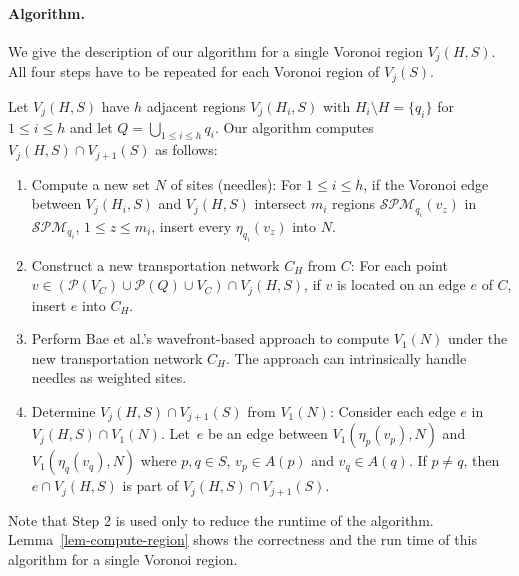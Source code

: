 \documentclass[11pt]{llncs}
\renewcommand{\P}{\ensuremath{\mathcal{P}}}
\newcommand{\SPM}{\ensuremath{\mathcal{SPM}}}
\begin{document}
\paragraph{Algorithm.}
We give the description of our algorithm for a single Voronoi region $V_{j}(H, S)$.
All four steps have to be repeated for each Voronoi region of $V_j(S)$.

Let $V_{j}(H, S)$ have $h$ adjacent regions $V_{j}(H_i, S)$ with $H_i \setminus H = \{q_i\}$ for $1\leq i\leq h$
and let $Q = \bigcup_{1\leq i\leq h} q_i$.
Our algorithm computes $V_{j}(H, S)\cap V_{j+1}(S)$ as follows:
\begin{enumerate}
  \item Compute a new set $N$ of sites (needles):
        For $1\leq i\leq h$, if the Voronoi edge between $V_j(H_i, S)$ and $V_{j}(H, S)$ intersect $m_i$ regions $\SPM_{q_i}(v_z)$ in $\SPM_{q_i}$, $1 \leq z \leq m_i$, insert every $\eta_{q_i}(v_z)$ into $N$.
  \item Construct a new transportation network $C_H$ from $C$:
        For each point $v \in (\P(V_C)\cup \P(Q) \cup V_C)\cap V_{j}(H, S)$,
        if $v$ is located on an edge $e$ of $C$, insert $e$ into $C_H$.
  \item Perform Bae et al.'s wavefront-based approach
         to compute $V_1(N)$ under the new transportation network $C_H$.
         The approach can intrinsically handle needles as weighted sites.
  \item Determine $V_{j}(H, S)\cap V_{j+1}(S)$ from $V_1(N)$:
		Consider each edge $e$ in $V_{j}(H, S) \cap V_1(N)$.
        Let~$e$ be an edge between $V_1(\eta_p(v_p), N)$ and $V_1(\eta_q(v_q), N)$
        where $p, q\in S$, $v_p\in A(p)$ and $v_q\in A(q)$.
        If $p\neq q$, then $e\cap V_{j}(H, S)$ is part of $V_{j}(H, S)\cap V_{j+1}(S)$.
\end{enumerate}

Note that Step 2 is used only to reduce the runtime of the algorithm.
Lemma~\ref{lem-compute-region} shows the correctness and the run time of this algorithm for a single Voronoi region.

\newcommand{\lemcomputeregion}{$V_{j}(H, S)\cap V_{j+1}(S)$ can be computed in $O((h+m+c_H)\log (n+c))$ time,
where~$h$ is the number of Voronoi edges, $m$ is the number of mixed vertices,
and $c_H=|(\P(V_C)\cup V_C)\cap V_{j}(H, S)|$.
}
\end{document}
